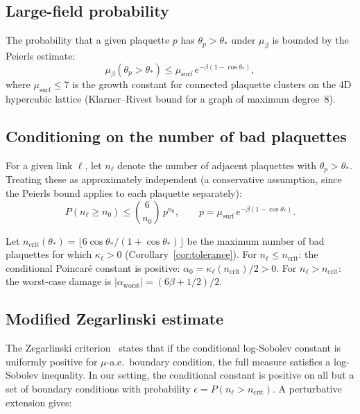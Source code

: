 \documentclass[11pt,a4paper]{article}
\theoremstyle{plain}
\theoremstyle{definition}
\theoremstyle{remark}
\begin{document}
\subsection{Large-field probability}

The probability that a given plaquette $p$ has $\theta_p > \theta_*$
under $\mu_\beta$ is bounded by the Peierls estimate:
\begin{equation}\label{eq:peierls-plaq}
  \mu_\beta(\theta_p > \theta_*)
  \leq \mu_{\mathrm{surf}}\,e^{-\beta(1 - \cos\theta_*)},
\end{equation}
where $\mu_{\mathrm{surf}} \leq 7$ is the growth constant for
connected plaquette clusters on the 4D hypercubic lattice
(Klarner--Rivest bound for a graph of maximum degree~$8$).

\subsection{Conditioning on the number of bad plaquettes}

For a given link $\ell$, let $n_\ell$ denote the number of
adjacent plaquettes with $\theta_p > \theta_*$.
Treating these as approximately independent
(a conservative assumption, since the Peierls bound
applies to each plaquette separately):
\begin{equation}\label{eq:n-bad-prob}
  P(n_\ell \geq n_0)
  \leq \binom{6}{n_0}\,p^{n_0},
  \qquad p = \mu_{\mathrm{surf}}\,e^{-\beta(1-\cos\theta_*)}.
\end{equation}

Let $n_{\mathrm{crit}}(\theta_*) = \lfloor 6\cos\theta_*
/ (1 + \cos\theta_*) \rfloor$ be the maximum number of bad
plaquettes for which $\kappa_\ell > 0$
(Corollary~\ref{cor:tolerance}).
For $n_\ell \leq n_{\mathrm{crit}}$: the conditional
Poincar\'e constant is positive:
$\alpha_0 = \kappa_\ell(n_{\mathrm{crit}}) / 2 > 0$.
For $n_\ell > n_{\mathrm{crit}}$: the worst-case damage is
$|\alpha_{\mathrm{worst}}| = (6\beta + 1/2)/2$.

\subsection{Modified Zegarlinski estimate}

The Zegarlinski criterion~\cite{Zegarlinski1992} states that
if the conditional log-Sobolev constant is uniformly positive
for $\mu$-a.e.\ boundary condition, the full measure satisfies
a log-Sobolev inequality.
In our setting, the conditional constant is positive on all
but a set of boundary conditions with probability
$\epsilon = P(n_\ell > n_{\mathrm{crit}})$.
A perturbative extension gives:
\end{document}
